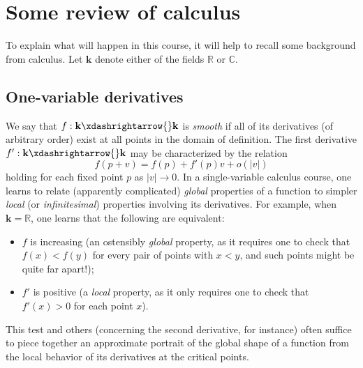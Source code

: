\documentclass[reqno]{amsart} 
\begin{document}
\section{Some review of calculus}
\label{sec:org2f1e843}
To explain what will happen in this course,
it will help to recall some
background from calculus.
Let $\mathbf{k}$ denote either of the fields $\mathbb{R}$ or $\mathbb{C}$.

\subsection{One-variable derivatives}
\label{sec:org428341e}
We say that $f : \mathbf{k} \xdashrightarrow{} \mathbf{k}$
is \emph{smooth} if all of its derivatives (of arbitrary order) exist at all points
in the domain of definition.
The first derivative $f' : \mathbf{k} \xdashrightarrow{} \mathbf{k}$
may be characterized by
the relation
\begin{equation*}
f(p + v) = f(p) + f'(p) v + o(|v|)
\end{equation*}
holding for each fixed point $p$ as $|v| \rightarrow 0$.  
In a single-variable calculus course, one learns
to relate (apparently complicated) \emph{global} properties of a
function to simpler \emph{local} (or \emph{infinitesimal})
properties involving its derivatives.  For example, when $\mathbf{k} = \mathbb{R}$, one learns
that the following are equivalent:
\begin{itemize}
 \item $f$ is
increasing (an ostensibly \emph{global} property, as it requires one to
check that $f(x) < f(y)$ for every pair of points with $x < y$,
and such points
might be quite far apart!);
\item $f'$ is positive (a \emph{local} property, as it
only requires one to check that $f'(x) > 0$ for each point $x$).
\end{itemize}
This test and others (concerning the second derivative, for instance) often suffice to piece together an
approximate portrait of the global shape of a function from the
local behavior of its derivatives at the critical points.
\end{document}
